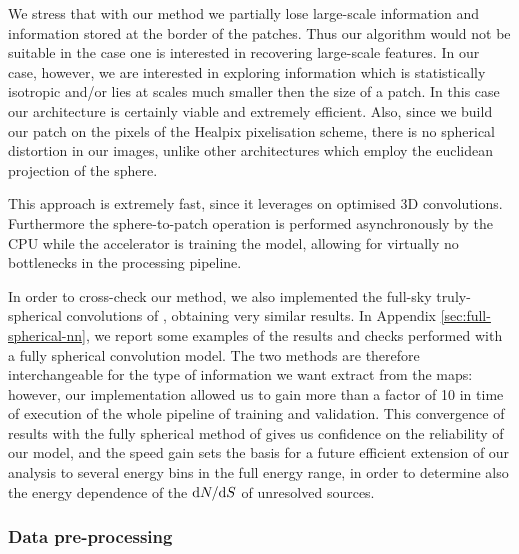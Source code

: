 {  We stress that with our method we partially lose large-scale information and information stored at the border of the patches.
Thus our algorithm would not be suitable in the case one is interested in recovering large-scale features.
In our case, however, we are interested in exploring information which is  statistically isotropic and/or lies at scales much smaller then the size of a patch. In this case our architecture is certainly viable and extremely efficient.}
Also, since  we  build our patch on the pixels of the Healpix pixelisation scheme, there is no spherical distortion in our images, unlike other architectures which employ the euclidean projection of the sphere.

This approach is extremely fast, since it leverages on optimised 3D convolutions. Furthermore the sphere-to-patch operation is performed asynchronously by the CPU while the accelerator is training the model, allowing for virtually no bottlenecks in the processing pipeline.

In order to cross-check our method, we also implemented the full-sky truly-spherical convolutions of \cite{Krachmalnicoff:2019}, obtaining very similar results. {  In  Appendix \ref{sec:full-spherical-nn}, we report some examples of the results and checks performed with a fully spherical convolution model.} The two methods are therefore interchangeable for the type of information we want extract from the \fermi maps: however, our implementation allowed us to gain more than a factor of 10 in time of execution of the whole pipeline of training and validation. This convergence of results with the fully spherical method of \cite{Krachmalnicoff:2019} gives us confidence on the reliability of our model, and the speed gain sets the basis for a future efficient extension of our analysis to several energy bins in the full \fermi energy range, in order to determine also the energy dependence of the $\text{d}N/\text{d}S$  of unresolved sources.


\subsubsection{Data pre-processing}
\label{sec:preprocessing}

